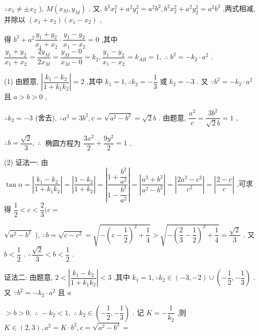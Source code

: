 $\therefore {x}_{1} \neq   \pm  {x}_{2}$ ), $M\left( {{x}_{M},{y}_{M}}\right)$ . 又, ${b}^{2}{x}_{1}^{2} + {a}^{2}{y}_{1}^{2} = {a}^{2}{b}^{2},{b}^{2}{x}_{2}^{2} + {a}^{2}{y}_{2}^{2} = {a}^{2}{b}^{2}$ ,两式相减,并除以 $\left( {{x}_{1} + {x}_{2}}\right) \left( {{x}_{1} - {x}_{2}}\right)$ ,

得 ${b}^{2} + {a}^{2}\dfrac{{y}_{1} + {y}_{2}}{{x}_{1} + {x}_{2}} \cdot  \dfrac{{y}_{1} - {y}_{2}}{{x}_{1} - {x}_{2}} = 0$ ,其中 $\dfrac{{y}_{1} + {y}_{2}}{{x}_{1} + {x}_{2}} = \dfrac{2{y}_{M}}{2{x}_{M}} = \dfrac{{y}_{M} - 0}{{x}_{M} - 0} = {k}_{2},\dfrac{{y}_{1} - {y}_{2}}{{x}_{1} - {x}_{2}} = {k}_{AB} = 1,\;\therefore \;{b}^{2} =  - {k}_{2} \cdot  {a}^{2}$ .

(1) 由题意, $\left| \dfrac{{k}_{1} - {k}_{2}}{1 + {k}_{1}{k}_{2}}\right|  = 2$ ,其中 ${k}_{1} = 1,\therefore {k}_{2} =  - \dfrac{1}{3}$ 或 ${k}_{2} =  - 3$ . 又 $\because {b}^{2} =  - {k}_{2} \cdot  {a}^{2}$ 且 $a > b > 0$ ,

$\therefore {k}_{2} =  - 3$ (舍去), $\therefore {a}^{2} = 3{b}^{2},c = \sqrt{{a}^{2} - {b}^{2}} = \sqrt{2}b$ . 由题意, $\dfrac{{a}^{2}}{c} = \dfrac{3{b}^{2}}{\sqrt{2}b} = 1$ ,

$\therefore b = \dfrac{\sqrt{2}}{3},\;\therefore \;$ 椭圆方程为 $\dfrac{3{x}^{2}}{2} + \dfrac{9{y}^{2}}{2} = 1$ .

(2) 证法一: 由 $\tan \alpha  = \left| \dfrac{{k}_{1} - {k}_{2}}{1 + {k}_{1}{k}_{2}}\right|  = \left| \dfrac{1 - {k}_{2}}{1 + {k}_{2}}\right|  = \left| \dfrac{1 + \dfrac{{b}^{2}}{{a}^{2}}}{1 - \dfrac{{b}^{2}}{{a}^{2}}}\right|  = \left| \dfrac{{a}^{2} + {b}^{2}}{{a}^{2} - {b}^{2}}\right|  = \left| \dfrac{2{a}^{2} - {c}^{2}}{{c}^{2}}\right|  = \left| \dfrac{2 - c}{c}\right|$ ,可求得 $\dfrac{1}{2} < c < \dfrac{2}{3}(c =$

$\sqrt{{a}^{2} - {b}^{2}}$ ), $\therefore b = \sqrt{c - {c}^{2}} = \sqrt{-{\left( c - \dfrac{1}{2}\right) }^{2} + \dfrac{1}{4}} > \sqrt{-{\left( \dfrac{2}{3} - \dfrac{1}{2}\right) }^{2} + \dfrac{1}{4}} = \dfrac{\sqrt{2}}{3}$ . 又 $b < \dfrac{1}{2}$ . $\therefore \dfrac{\sqrt{2}}{3} < b < \dfrac{1}{2}$ .

证法二: 由题意, $2 < \left| \dfrac{{k}_{1} - {k}_{2}}{1 + {k}_{1}{k}_{2}}\right|  < 3$ ,其中 ${k}_{1} = 1,\therefore {k}_{2} \in  \left( {-3, - 2}\right)  \cup  \left( {-\dfrac{1}{2}, - \dfrac{1}{3}}\right)$ . 又 $\because {b}^{2} =  - {k}_{2} \cdot  {a}^{2}$ 且 $a$

$> b > 0,\;\therefore \; - {k}_{2} < 1,\;\therefore \;{k}_{2} \in  \left( {-\dfrac{1}{2}, - \dfrac{1}{3}}\right)$ . 记 $K =  - \dfrac{1}{{k}_{2}}$ ,则 $K \in  \left( {2,3}\right) ,{a}^{2} = K \cdot  {b}^{2},c = \sqrt{{a}^{2} - {b}^{2}} =$

